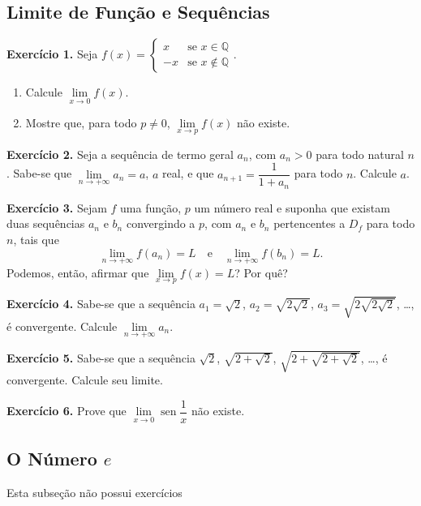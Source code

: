 \documentclass[12pt,a4paper]{article}
\begin{document}
\subsection{Limite de Função e Sequências}
\vspace{0.5cm}
\noindent\textbf{Exercício 1.} Seja $f(x) = \begin{cases} x & \text{se } x \in \mathbb{Q} \\ -x & \text{se } x \notin \mathbb{Q} \end{cases}$.
\begin{enumerate}
    \renewcommand{\theenumi}{\alph{enumi}}
    \renewcommand{\labelenumi}{\theenumi)}
    \item Calcule $\lim\limits_{x \to 0} f(x)$.
    \item Mostre que, para todo $p \neq 0$, $\lim\limits_{x \to p} f(x)$ não existe.
\end{enumerate}

\vspace{0.5cm}
\noindent\textbf{Exercício 2.}
Seja a sequência de termo geral $a_n$, com $a_n > 0$ para todo natural $n$. Sabe-se que $\lim\limits_{n \to +\infty} a_n = a$, $a$ real, e que $a_{n+1} = \dfrac{1}{1 + a_n}$ para todo $n$. Calcule $a$.

\vspace{0.5cm}
\noindent\textbf{Exercício 3.}
Sejam $f$ uma função, $p$ um número real e suponha que existam duas sequências $a_n$ e $b_n$ convergindo a $p$, com $a_n$ e $b_n$ pertencentes a $D_f$ para todo $n$, tais que
\[
\lim_{n \to +\infty} f(a_n) = L \quad\text{e}\quad \lim_{n \to +\infty} f(b_n) = L.
\]
Podemos, então, afirmar que $\lim\limits_{x \to p} f(x) = L$? Por quê?

\vspace{0.5cm}
\noindent\textbf{Exercício 4.}
Sabe-se que a sequência $a_1 = \sqrt{2}$, $a_2 = \sqrt{2\sqrt{2}}$, $a_3 = \sqrt{2\sqrt{2\sqrt{2}}}$, \dots, é convergente. Calcule $\lim\limits_{n \to +\infty} a_n$.

\vspace{0.5cm}
\noindent\textbf{Exercício 5.}
Sabe-se que a sequência $\sqrt{2}$, $\sqrt{2 + \sqrt{2}}$, $\sqrt{2 + \sqrt{2 + \sqrt{2}}}$, \dots, é convergente. Calcule seu limite.

\vspace{0.5cm}
\noindent\textbf{Exercício 6.}
Prove que $\lim\limits_{x \to 0} \operatorname{sen}\dfrac{1}{x}$ não existe.

\subsection{O Número $e$}
Esta subseção não possui exercícios
\end{document}
